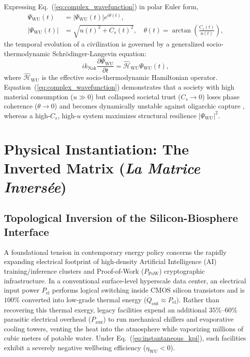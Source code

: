 \documentclass[aps,pre,twocolumn,10pt,superscriptaddress,amsmath,amssymb,amsfonts,floatfix,showkeys]{revtex4-2}
\begin{document}
Expressing Eq.~(\ref{eq:complex_wavefunction}) in polar Euler form,
\begin{equation}
\begin{aligned}
    \Psi_{\text{WU}}(t) &= |\Psi_{\text{WU}}(t)| e^{i\theta(t)}, \\
    |\Psi_{\text{WU}}(t)| &= \sqrt{u(t)^2 + C_s(t)^2}, \quad \theta(t) = \arctan\left(\frac{C_s(t)}{u(t)}\right),
\end{aligned}
\label{eq:polar_form}
\end{equation}
the temporal evolution of a civilization is governed by a generalized socio-thermodynamic Schr\"odinger-Langevin equation:
\begin{equation}
    i k_{\text{Nak}} \frac{\partial \Psi_{\text{WU}}}{\partial t} = \hat{\mathcal{H}}_{\text{WU}} \Psi_{\text{WU}}(t),
    \label{eq:schrodinger_wu}
\end{equation}
where $\hat{\mathcal{H}}_{\text{WU}}$ is the effective socio-thermodynamic Hamiltonian operator. Equation~(\ref{eq:complex_wavefunction}) demonstrates that a society with high material consumption ($u \gg 0$) but collapsed societal trust ($C_s \to 0$) loses phase coherence ($\theta \to 0$) and becomes dynamically unstable against oligarchic capture \cite{Kuhner2014}, whereas a high-$C_s$, high-$u$ system maximizes structural resilience $|\Psi_{\text{WU}}|^2$.

\section{Physical Instantiation: The Inverted Matrix (\textit{La Matrice Invers\'ee})}

\subsection{Topological Inversion of the Silicon-Biosphere Interface}

A foundational tension in contemporary energy policy concerns the rapidly expanding electrical footprint of high-density Artificial Intelligence (AI) training/inference clusters and Proof-of-Work ($P_{\text{PoW}}$) cryptographic infrastructure. In a conventional surface-level hyperscale data center, an electrical input power $P_{\text{el}}$ performs logical switching inside CMOS silicon transistors and is $100\%$ converted into low-grade thermal energy ($\dot{Q}_{\text{out}} \approx P_{\text{el}}$). Rather than recovering this thermal exergy, legacy facilities expend an additional $35\%\text{--}60\%$ parasitic electrical overhead ($P_{\text{aux}}$) to run mechanical chillers and evaporative cooling towers, venting the heat into the atmosphere while vaporizing millions of cubic meters of potable water. Under Eq.~(\ref{eq:instantaneous_kpi}), such facilities exhibit a severely negative wellbeing efficiency ($\eta_{\text{WU}} < 0$).
\end{document}
